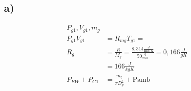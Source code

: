 

\subsection*{a)}
\begin{align*}
    P_{g1}, V_{g1}, m_g \\
    P_{g1} V_{g1} &= R_{mg} T_{g1} = \\
    R_g &= \frac{R}{M_g} = \frac{8{,}314 \frac{J}{\text{mol K}}}{50 \frac{g}{\text{mol}}} = 0{,}166 \frac{J}{g K} \\
    &= 166 \frac{J}{kg K} \\
    P_{EW} + P_{G1} &= \frac{m_g}{\pi D^2_g} + \text{Pamb}
\end{align*}